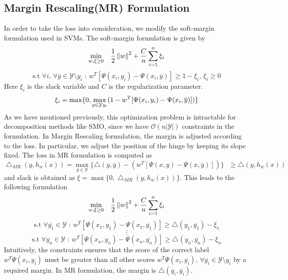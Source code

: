 \subsection{Margin Rescaling(MR) Formulation}
In order to take the loss into consideration, we modify the soft-margin formulation used in SVMs. The soft-margin formulation is given by
\[\underset{w, \xi \geq 0}{\min} \quad \frac{1}{2} \left\lVert w\right\rVert^2 + \frac{C}{n} \sum_{i=1}^n \xi_i \]
\[ \textrm{s.t } \forall i \textrm{, } \forall \overline{y} \in \mathcal{Y}\setminus y_i \textrm{  :  } w^T[\Psi(x_i, y_i) - \Psi(x_i, \overline{y})] \geq 1 - \xi_i \textrm{, } \xi_i \geq 0 \]
Here $\xi_i$ is the slack variable and $C$ is the regularization parameter.
\[ \xi_i = \max\{ 0, \max_{y \in \mathcal{Y}\\y_i}(1 - w^T[\Psi(x_i, y_i) - \Psi(x_i, \overline{y})]) \} \]
As we have mentioned previously, this optimization problem is intractable for decomposition methods like SMO, since we have $\mathcal{O}(n|\mathcal{Y}|)$ constraints in the formulation. In Margin Rescaling formulation, the margin is adjusted according to the loss. In particular, we adjust the position of the hinge by keeping its slope fixed. The loss in MR formulation is computed as
\[ \bigtriangleup_{MR}(y, h_w(x)) =  \underset{\overline{y} \in \mathcal{Y}}{\max}\{ \bigtriangleup(y, \overline{y}) - (w^T[\Psi(x, y) - \Psi(x, \overline{y})]) \}  \textrm{ } \geq  \bigtriangleup(y, h_w(x))\]
and slack is obtained as $\xi = \max\{0, \bigtriangleup_{MR}(y, h_w(x))\}$. This leads to the following formulation
\[\underset{w, \xi \geq 0}{\min} \quad \frac{1}{2} \left\lVert w\right\rVert^2 + \frac{C}{n} \sum_{i=1}^n \xi_i \]
\[ \textrm{s.t } \forall \overline{y_1} \in \mathcal{Y} \textrm{  :  } w^T[\Psi(x_1, y_1) - \Psi(x_1, \overline{y_1})] \geq \bigtriangleup(y_1, \overline{y_1}) - \xi_1 \]
\[ \vdots \]
\[ \textrm{s.t } \forall \overline{y_n} \in \mathcal{Y} \textrm{  :  } w^T[\Psi(x_n, y_n) - \Psi(x_n, \overline{y_n})] \geq \bigtriangleup(y_n, \overline{y_n}) - \xi_n \]
Intuitively, the constraints ensures that the score of the correct label $w^T\Psi(x_i, y_i)$ must be greater than all other scores $w^T\Psi(x_i, \overline{y_i}) \textrm{, } \forall \overline{y_i} \in \mathcal{Y} \setminus y_i$ by a required margin. In MR formulation, the margin is $\bigtriangleup(y_i, \overline{y_i})$.

